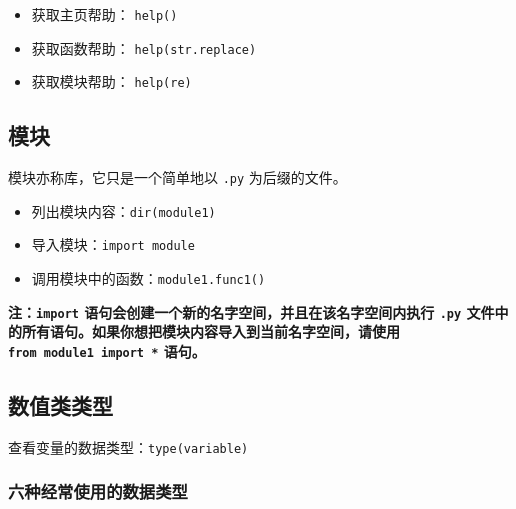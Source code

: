 \documentclass[utf-8]{ctexart}
\begin{document}
\begin{itemize}
\item
  获取主页帮助： \texttt{help()}
\item
  获取函数帮助： \texttt{help(str.replace)}
\item
  获取模块帮助： \texttt{help(re)}
\end{itemize}

\hypertarget{header-n54}{\subsection{模块}\label{header-n54}}

模块亦称库，它只是一个简单地以 \texttt{.py} 为后缀的文件。

\begin{itemize}
\item
  列出模块内容：\texttt{dir(module1)}
\item
  导入模块：\texttt{import\ module}
\item
  调用模块中的函数：\texttt{module1.func1()}
\end{itemize}

\textbf{注：\texttt{import}
语句会创建一个新的名字空间，并且在该名字空间内执行 \texttt{.py}
文件中的所有语句。如果你想把模块内容导入到当前名字空间，请使用
\texttt{from\ module1\ import\ *} 语句。}

\hypertarget{header-n69}{\subsection{数值类类型}\label{header-n69}}

查看变量的数据类型：\texttt{type(variable)}

\subsubsection{六种经常使用的数据类型}\label{header-n72}
\end{document}
